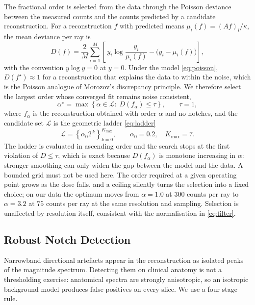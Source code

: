 The fractional order is selected from the data through the Poisson deviance
between the measured counts and the counts predicted by a candidate
reconstruction. For a reconstruction $f$ with predicted means
$\mu_{i}(f)=(Af)_{i}/\kappa$, the mean deviance per ray is
\begin{equation}
  D(f)=\frac{2}{M}\sum_{i=1}^{M}
  \left[\,y_{i}\log\frac{y_{i}}{\mu_{i}(f)}-\bigl(y_{i}-\mu_{i}(f)\bigr)\right],
  \label{eq:deviance}
\end{equation}
with the convention $y\log y=0$ at $y=0$. Under the model \eqref{eq:poisson},
$D(f^{\star})\approx 1$ for a reconstruction that explains the data to within
the noise, which is the Poisson analogue of Morozov's discrepancy principle.
We therefore select the largest order whose converged fit remains
noise consistent,
\begin{equation}
  \alpha^{\star}=\max\left\{\alpha\in\mathcal{L}:\;D\!\left(f_{\alpha}\right)\le\tau\right\},
  \qquad \tau=1,
  \label{eq:morozov}
\end{equation}
where $f_{\alpha}$ is the reconstruction obtained with order $\alpha$ and no
notches, and the candidate set $\mathcal{L}$ is the geometric ladder \eqref{eq:ladder}
\begin{equation}
  \mathcal{L}=\left\{\alpha_{0}2^{\,k}\right\}_{k=0}^{K_{\max}},
  \qquad \alpha_{0}=0.2,\quad K_{\max}=7 .
  \label{eq:ladder}
\end{equation}
The ladder is evaluated in ascending order and the search stops at the first
violation of $D\le\tau$, which is exact because $D(f_{\alpha})$ is monotone
increasing in $\alpha$: stronger smoothing can only widen the gap between the
model and the data. A bounded grid must not be used here. The order required
at a given operating point grows as the dose falls, and a ceiling silently
turns the selection into a fixed choice; on our data the optimum moves from
$\alpha=1.0$ at $300$ counts per ray to $\alpha=3.2$ at $75$ counts per ray
at the same resolution and sampling. Selection is unaffected by resolution
itself, consistent with the normalisation in \eqref{eq:filter}.

\subsection{Robust Notch Detection}
\label{sec:notch}

Narrowband directional artefacts appear in the reconstruction as isolated
peaks of the magnitude spectrum. Detecting them on clinical anatomy is not a
thresholding exercise: anatomical spectra are strongly anisotropic, so an
isotropic background model produces false positives on every slice. We use a
four stage rule.

